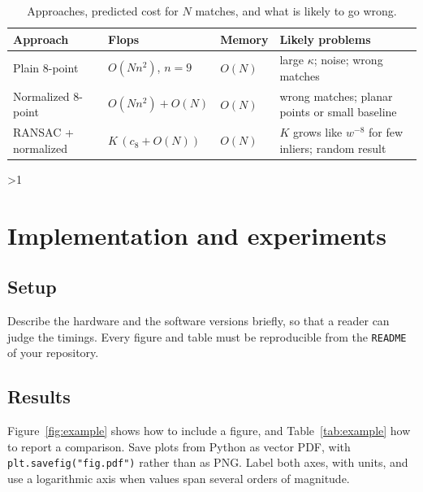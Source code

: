 \documentclass[11pt,a4paper]{article}
\newcommand{\stage}{1}
\newif\ifshowguide
\theoremstyle{plain}
\theoremstyle{definition}
\theoremstyle{remark}
\newcommand{\guide}[1]{\ifshowguide\par\smallskip\noindent
  \colorbox{gray!12}{\parbox{\dimexpr\linewidth-2\fboxsep}{\small\itshape
  \textbf{Guidance.} #1}}\par\smallskip\fi}
\begin{document}
\begin{table}[ht]
  \centering
  \caption{Approaches, predicted cost for $N$ matches, and what is likely to go wrong.}
  \label{tab:approaches}
  \begin{tabularx}{\linewidth}{@{}lllX@{}}
    \toprule
    Approach & Flops & Memory & Likely problems \\
    \midrule
    Plain 8-point      & $O(Nn^2)$, $n=9$ & $O(N)$ & large $\kappa$; noise; wrong matches \\
    Normalized 8-point & $O(Nn^2)+O(N)$ & $O(N)$ & wrong matches; planar points or small baseline \\
    RANSAC + normalized & $K\,(c_8+O(N))$ & $O(N)$ & $K$ grows like $w^{-8}$ for few inliers; random result \\
    \bottomrule
  \end{tabularx}
\end{table}

\ifnum\stage>1
\section{Implementation and experiments}
\label{sec:experiments}

\guide{Criterion D. What you implemented yourselves, and what you called
from a library. The data, the benchmark and the metrics. Then the
results: accuracy, the condition numbers of the matrices you actually
factor, runtime against problem size next to the predicted cost, and the
size or condition number at which a method stops working.
\emph{Interim report 2}: a first implementation running on small data
and one comparison with a library routine, with one figure.}

\subsection{Setup}

Describe the hardware and the software versions briefly, so that a
reader can judge the timings. Every figure and table must be
reproducible from the \texttt{README} of your repository.

\subsection{Results}

Figure~\ref{fig:example} shows how to include a figure, and
Table~\ref{tab:example} how to report a comparison. Save plots from
Python as vector PDF, with \texttt{plt.savefig("fig.pdf")} rather than
as PNG. Label both axes, with units, and use a logarithmic axis when
values span several orders of magnitude.
\end{document}
